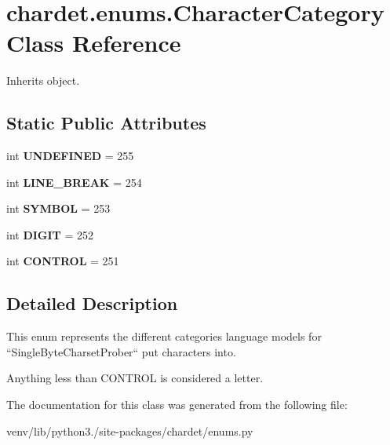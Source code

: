 \hypertarget{classchardet_1_1enums_1_1_character_category}{}\section{chardet.\+enums.\+Character\+Category Class Reference}
\label{classchardet_1_1enums_1_1_character_category}


Inherits object.

\subsection*{Static Public Attributes}
\begin{DoxyCompactItemize}
\item 
\mbox{\label{classchardet_1_1enums_1_1_character_category_a3ff7a1e13372b4269fdf1c639f61ea16}} 
int {\bfseries U\+N\+D\+E\+F\+I\+N\+ED} = 255
\item 
\mbox{\label{classchardet_1_1enums_1_1_character_category_aaa080feaef2b7ed3d454df712729d8ad}} 
int {\bfseries L\+I\+N\+E\+\_\+\+B\+R\+E\+AK} = 254
\item 
\mbox{\label{classchardet_1_1enums_1_1_character_category_aa4a624e96269044f73aecab298a4b834}} 
int {\bfseries S\+Y\+M\+B\+OL} = 253
\item 
\mbox{\label{classchardet_1_1enums_1_1_character_category_a9735184199bf6ea2e99318bd51e90d47}} 
int {\bfseries D\+I\+G\+IT} = 252
\item 
\mbox{\label{classchardet_1_1enums_1_1_character_category_acb8bc5be668b14cce95bc55b0565ebb2}} 
int {\bfseries C\+O\+N\+T\+R\+OL} = 251
\end{DoxyCompactItemize}


\subsection{Detailed Description}
\begin{DoxyVerb}This enum represents the different categories language models for
``SingleByteCharsetProber`` put characters into.

Anything less than CONTROL is considered a letter.
\end{DoxyVerb}
 

The documentation for this class was generated from the following file\+:\begin{DoxyCompactItemize}
\item 
venv/lib/python3./site-\/packages/chardet/enums.\+py\end{DoxyCompactItemize}
